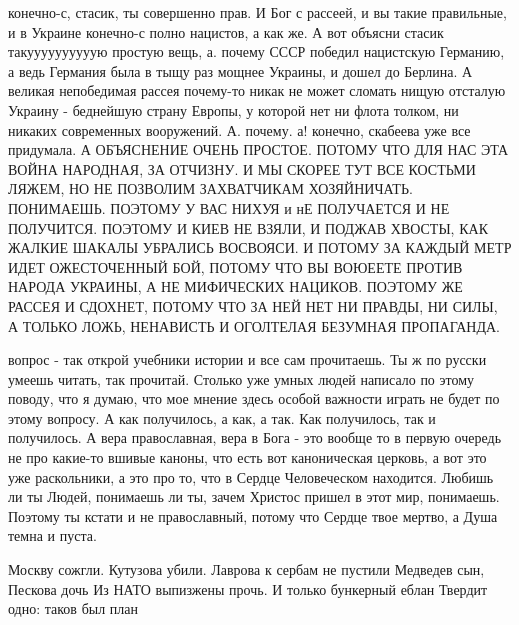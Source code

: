 конечно-с, стасик, ты совершенно прав. И Бог с рассеей, и вы такие правильные,
и в Украине конечно-с полно нацистов, а как же. А вот объясни стасик
такуууууууууую простую вещь, а. почему СССР победил нацистскую Германию, а ведь
Германия была в тыщу раз мощнее Украины, и дошел до Берлина. А великая
непобедимая рассея почему-то никак не может сломать нищую отсталую Украину -
беднейшую страну Европы, у которой нет ни флота толком, ни никаких современных
вооружений. А. почему. а! конечно, скабеева уже все придумала. А ОБЪЯСНЕНИЕ
ОЧЕНЬ ПРОСТОЕ. ПОТОМУ ЧТО ДЛЯ НАС ЭТА ВОЙНА НАРОДНАЯ, ЗА ОТЧИЗНУ. И МЫ СКОРЕЕ
ТУТ ВСЕ КОСТЬМИ ЛЯЖЕМ, НО НЕ ПОЗВОЛИМ ЗАХВАТЧИКАМ ХОЗЯЙНИЧАТЬ. ПОНИМАЕШЬ.
ПОЭТОМУ У ВАС НИХУЯ и нЕ ПОЛУЧАЕТСЯ И НЕ ПОЛУЧИТСЯ. ПОЭТОМУ И КИЕВ НЕ ВЗЯЛИ, И
ПОДЖАВ ХВОСТЫ, КАК ЖАЛКИЕ ШАКАЛЫ УБРАЛИСЬ ВОСВОЯСИ. И ПОТОМУ ЗА КАЖДЫЙ МЕТР
ИДЕТ ОЖЕСТОЧЕННЫЙ БОЙ, ПОТОМУ ЧТО ВЫ ВОЮЕЕТЕ ПРОТИВ НАРОДА УКРАИНЫ, А НЕ
МИФИЧЕСКИХ НАЦИКОВ. ПОЭТОМУ ЖЕ РАССЕЯ И СДОХНЕТ, ПОТОМУ ЧТО ЗА НЕЙ НЕТ НИ
ПРАВДЫ, НИ СИЛЫ, А ТОЛЬКО ЛОЖЬ, НЕНАВИСТЬ И ОГОЛТЕЛАЯ БЕЗУМНАЯ ПРОПАГАНДА.

вопрос - так открой учебники истории и все сам прочитаешь. Ты ж по русски
умеешь читать, так прочитай. Столько уже умных людей написало по этому поводу,
что я думаю, что мое мнение здесь особой важности играть не будет по этому
вопросу. А как получилось, а как, а так. Как получилось, так и получилось. А
вера православная, вера в Бога - это вообще то в первую очередь не про какие-то
вшивые каноны, что есть вот каноническая церковь, а вот это уже раскольники, а
это про то, что в Сердце Человеческом находится. Любишь ли ты Людей, понимаешь
ли ты, зачем Христос пришел в этот мир, понимаешь. Поэтому ты кстати и не
православный, потому что Сердце твое мертво, а Душа темна и пуста.

Москву сожгли.
Кутузова убили.
Лаврова к сербам не пустили
Медведев сын,
Пескова дочь
Из НАТО выпизжены прочь.
И только бункерный еблан
Твердит одно: таков был план
